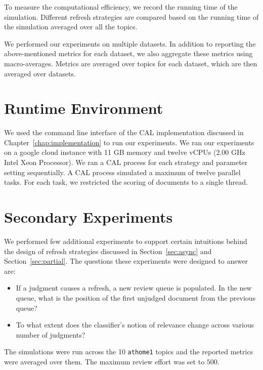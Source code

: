 To measure the computational efficiency, we record the running time of the
simulation. Different refresh strategies are compared based on the running time
of the simulation averaged over all the topics.

We performed our experiments on multiple datasets. In addition to reporting
the above-mentioned metrics for each dataset, we also aggregate these metrics
using macro-averages. Metrics are averaged over topics for
each dataset, which are then averaged over datasets.


\section{Runtime Environment}

We used the command line interface of the CAL implementation discussed in
Chapter~\ref{chap:implementation} to run our experiments. We ran our experiments
on a google cloud instance with 11 GB memory and twelve vCPUs (2.00 GHz Intel Xeon
Processor). We ran a CAL process for each strategy and parameter setting
sequentially. A CAL process simulated a maximum of twelve parallel tasks. For
each task, we restricted the scoring of documents to a single thread.

\section{Secondary Experiments}
\label{sec:secondary}

We performed few additional experiments to support certain intuitions behind the
design of refresh strategies discussed in Section~\ref{sec:async} and
Section~\ref{sec:partial}. The questions these experiments were designed to
answer are:
\begin{itemize}
    \item If a judgment causes a refresh, a new review queue is populated.
        In the new queue, what is the position of the first unjudged document
        from the previous queue?
    \item To what extent does the classifier's notion of relevance change across
        various number of judgments?
\end{itemize}

The simulations were run across the 10
\texttt{athome1} topics and the reported metrics were averaged over them. The
maximum review effort was set to $500$.



